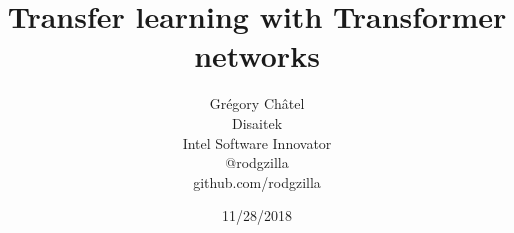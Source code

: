 \documentclass[9pt]{beamer}
\title{Transfer learning with Transformer networks}
\author[G. Châtel]{Grégory Châtel\\\vspace{0.3cm}Disaitek\\Intel Software Innovator\\\vspace{0.3cm}@rodgzilla\\github.com/rodgzilla}
\date{11/28/2018}
\begin{document}
\begin{frame}

  \maketitle

\end{frame}
\end{document}
